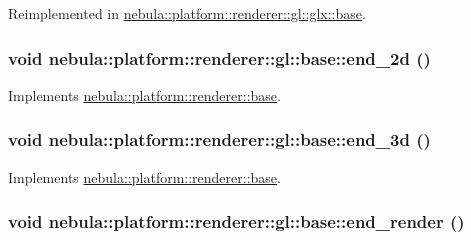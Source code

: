 Reimplemented in \hyperlink{classnebula_1_1platform_1_1renderer_1_1gl_1_1glx_1_1base_a969f44b3066064468c15596562c18e00}{nebula::platform::renderer::gl::glx::base}.\hypertarget{classnebula_1_1platform_1_1renderer_1_1gl_1_1base_ac543d418a1acc58a178e96f552af1aca}{
\subsubsection[{end\_\-2d}]{\setlength{\rightskip}{0pt plus 5cm}void nebula::platform::renderer::gl::base::end\_\-2d ()}}
\label{classnebula_1_1platform_1_1renderer_1_1gl_1_1base_ac543d418a1acc58a178e96f552af1aca}


Implements \hyperlink{classnebula_1_1platform_1_1renderer_1_1base_a5e365d3edf9b4196d101e265a52a7157}{nebula::platform::renderer::base}.\hypertarget{classnebula_1_1platform_1_1renderer_1_1gl_1_1base_a6433b19464dae4b08fcfd20ca1ca8731}{
\subsubsection[{end\_\-3d}]{\setlength{\rightskip}{0pt plus 5cm}void nebula::platform::renderer::gl::base::end\_\-3d ()}}
\label{classnebula_1_1platform_1_1renderer_1_1gl_1_1base_a6433b19464dae4b08fcfd20ca1ca8731}


Implements \hyperlink{classnebula_1_1platform_1_1renderer_1_1base_a0029bf3d8dca641962a7f54cbc0d8a35}{nebula::platform::renderer::base}.\hypertarget{classnebula_1_1platform_1_1renderer_1_1gl_1_1base_ae07ce667896249b4b60e800a985f0721}{
\subsubsection[{end\_\-render}]{\setlength{\rightskip}{0pt plus 5cm}void nebula::platform::renderer::gl::base::end\_\-render ()}}
\label{classnebula_1_1platform_1_1renderer_1_1gl_1_1base_ae07ce667896249b4b60e800a985f0721}



